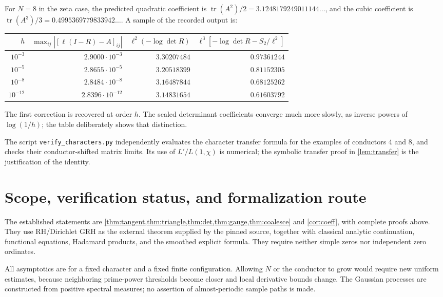 \documentclass[11pt]{article}
\theoremstyle{definition}
\newcommand{\tr}{\operatorname{tr}}
\begin{document}
For $N=8$ in the zeta case, the predicted quadratic coefficient is
$\tr(A^2)/2=3.1248179249011144\ldots$, and the cubic coefficient is
$\tr(A^3)/3=0.4995369779833942\ldots$. A sample of the recorded output is:
\begin{center}
\small
\begin{tabular}{@{}rrrr@{}}
\toprule
$h$ & $\max_{ij}|[\ell(I-R)-A]_{ij}|$
& $\ell^2(-\log\det R)$ &
$\ell^3[-\log\det R-S_2/\ell^2]$\\
\midrule
$10^{-3}$ & $2.9000\cdot10^{-3}$ & $3.30207484$ & $0.97361244$\\
$10^{-5}$ & $2.8655\cdot10^{-5}$ & $3.20518399$ & $0.81152305$\\
$10^{-8}$ & $2.8484\cdot10^{-8}$ & $3.16487844$ & $0.68125262$\\
$10^{-12}$ & $2.8396\cdot10^{-12}$ & $3.14831654$ & $0.61603792$\\
\bottomrule
\end{tabular}
\end{center}
The first correction is recovered at order $h$. The scaled determinant
coefficients converge much more slowly, as inverse powers of $\log(1/h)$;
the table deliberately shows that distinction.

The script \texttt{verify\_characters.py} independently evaluates the character
transfer formula for the examples of conductors $4$ and $8$, and checks their
conductor-shifted matrix limits. Its use of $L'/L(1,\chi)$ is numerical; the
symbolic transfer proof in \cref{lem:transfer} is the justification of the identity.

\section{Scope, verification status, and formalization route}

The established statements are \cref{thm:tangent,thm:triangle,thm:det,thm:gauge,thm:coalesce}
and \cref{cor:coeff}, with complete proofs above. They use RH/Dirichlet GRH as the
external theorem supplied by the pinned source, together with classical analytic
continuation, functional equations, Hadamard products, and the smoothed explicit
formula. They require neither simple zeros nor independent zero ordinates.

All asymptotics are for a fixed character and a fixed finite configuration.
Allowing $N$ or the conductor to grow would require new uniform estimates,
because neighboring prime-power thresholds become closer and local derivative
bounds change. The Gaussian processes are constructed from positive spectral
measures; no assertion of almost-periodic sample paths is made.
\end{document}

